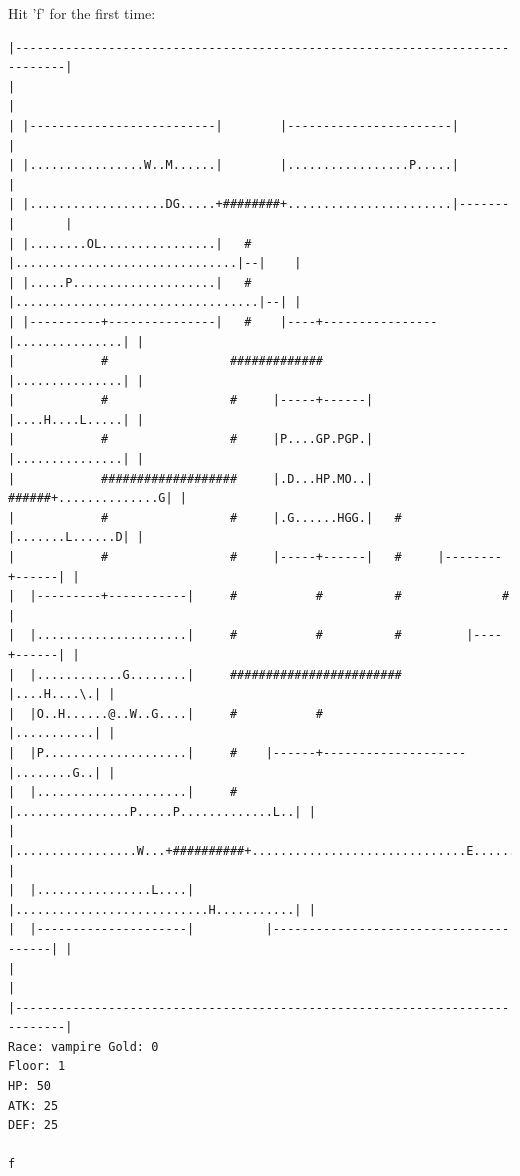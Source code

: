 \documentclass[11pt]{article}
\theoremstyle{plain}
\begin{document}
Hit 'f' for the first time:
\begin{Verbatim}[fontsize=\scriptsize]
|-----------------------------------------------------------------------------|
|                                                                             |
| |--------------------------|        |-----------------------|               |
| |................W..M......|        |.................P.....|               |
| |...................DG.....+########+.......................|-------|       |
| |........OL................|   #    |...............................|--|    |
| |.....P....................|   #    |..................................|--| |
| |----------+---------------|   #    |----+----------------|...............| |
|            #                 #############                |...............| |
|            #                 #     |-----+------|         |....H....L.....| |
|            #                 #     |P....GP.PGP.|         |...............| |
|            ###################     |.D...HP.MO..|   ######+..............G| |
|            #                 #     |.G......HGG.|   #     |.......L......D| |
|            #                 #     |-----+------|   #     |--------+------| |
|  |---------+-----------|     #           #          #              #        |
|  |.....................|     #           #          #         |----+------| |
|  |............G........|     ########################         |....H....\.| |
|  |O..H......@..W..G....|     #           #                    |...........| |
|  |P....................|     #    |------+--------------------|........G..| |
|  |.....................|     #    |................P.....P.............L..| |
|  |.................W...+##########+..............................E........| |
|  |................L....|          |...........................H...........| |
|  |---------------------|          |---------------------------------------| |
|                                                                             |
|-----------------------------------------------------------------------------|
Race: vampire Gold: 0                                                  Floor: 1
HP: 50
ATK: 25
DEF: 25

f


\end{Verbatim}
\end{document}
